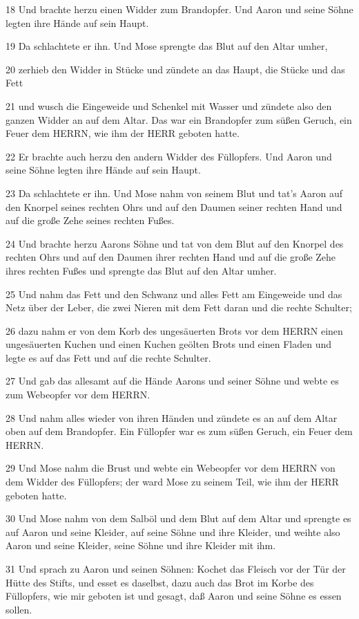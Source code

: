 \par 18 Und brachte herzu einen Widder zum Brandopfer. Und Aaron und seine Söhne legten ihre Hände auf sein Haupt.
\par 19 Da schlachtete er ihn. Und Mose sprengte das Blut auf den Altar umher,
\par 20 zerhieb den Widder in Stücke und zündete an das Haupt, die Stücke und das Fett
\par 21 und wusch die Eingeweide und Schenkel mit Wasser und zündete also den ganzen Widder an auf dem Altar. Das war ein Brandopfer zum süßen Geruch, ein Feuer dem HERRN, wie ihm der HERR geboten hatte.
\par 22 Er brachte auch herzu den andern Widder des Füllopfers. Und Aaron und seine Söhne legten ihre Hände auf sein Haupt.
\par 23 Da schlachtete er ihn. Und Mose nahm von seinem Blut und tat's Aaron auf den Knorpel seines rechten Ohrs und auf den Daumen seiner rechten Hand und auf die große Zehe seines rechten Fußes.
\par 24 Und brachte herzu Aarons Söhne und tat von dem Blut auf den Knorpel des rechten Ohrs und auf den Daumen ihrer rechten Hand und auf die große Zehe ihres rechten Fußes und sprengte das Blut auf den Altar umher.
\par 25 Und nahm das Fett und den Schwanz und alles Fett am Eingeweide und das Netz über der Leber, die zwei Nieren mit dem Fett daran und die rechte Schulter;
\par 26 dazu nahm er von dem Korb des ungesäuerten Brots vor dem HERRN einen ungesäuerten Kuchen und einen Kuchen geölten Brots und einen Fladen und legte es auf das Fett und auf die rechte Schulter.
\par 27 Und gab das allesamt auf die Hände Aarons und seiner Söhne und webte es zum Webeopfer vor dem HERRN.
\par 28 Und nahm alles wieder von ihren Händen und zündete es an auf dem Altar oben auf dem Brandopfer. Ein Füllopfer war es zum süßen Geruch, ein Feuer dem HERRN.
\par 29 Und Mose nahm die Brust und webte ein Webeopfer vor dem HERRN von dem Widder des Füllopfers; der ward Mose zu seinem Teil, wie ihm der HERR geboten hatte.
\par 30 Und Mose nahm von dem Salböl und dem Blut auf dem Altar und sprengte es auf Aaron und seine Kleider, auf seine Söhne und ihre Kleider, und weihte also Aaron und seine Kleider, seine Söhne und ihre Kleider mit ihm.
\par 31 Und sprach zu Aaron und seinen Söhnen: Kochet das Fleisch vor der Tür der Hütte des Stifts, und esset es daselbst, dazu auch das Brot im Korbe des Füllopfers, wie mir geboten ist und gesagt, daß Aaron und seine Söhne es essen sollen.
